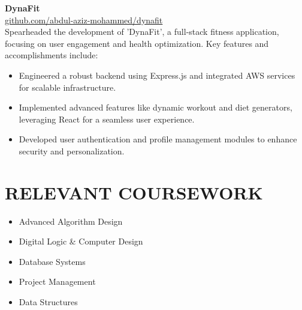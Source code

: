 \documentclass[letterpaper,10.9pt]{article}
\begin{document}
	\vspace{-1mm}
	\textbf{DynaFit} \\
	\href{https://github.com/abdul-aziz-mohammed/dynafit}{github.com/abdul-aziz-mohammed/dynafit} \\
	Spearheaded the development of 'DynaFit', a full-stack fitness application, focusing on user engagement and health optimization. Key features and accomplishments include:
	\begin{itemize}
		\vspace{-1mm}
		\item Engineered a robust backend using Express.js and integrated AWS services for scalable infrastructure.
		\item Implemented advanced features like dynamic workout and diet generators, leveraging React for a seamless user experience.
		\item Developed user authentication and profile management modules to enhance security and personalization.
	\end{itemize}
	
	\vspace{-2mm}
	\section*{\textbf{RELEVANT COURSEWORK}}
	\vspace{-2mm}
	\begin{multicols}{2}
		\begin{itemize}
			\item Advanced Algorithm Design
			\item Digital Logic \& Computer Design
			\item Database Systems
		\end{itemize}
		\columnbreak
		\begin{itemize}
			\item Project Management
			\item Data Structures
		\end{itemize}
	\end{multicols}
	
\end{document}
